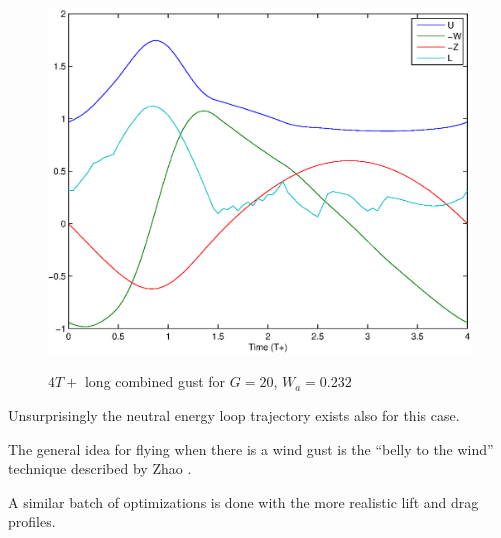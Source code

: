 \begin{figure}[h]
	\begin{center}
		\scalebox{0.8}
		{\includegraphics{./Figures/Windtype=3_Tg=4_Wg=0p232_quad_G=20.eps}}
	\end{center}
	\caption{$4T+$ long combined gust for $G=20$, $W_a=0.232$}
	\label{fig:combined_optimization}
\end{figure}
  
Unsurprisingly the neutral energy loop trajectory exists also for this case.

\par The general idea for flying when there is a wind gust is the ``belly to the wind'' technique described by Zhao \cite{zhao2004optimal}.

\FloatBarrier

\par A similar batch of optimizations is done with the more realistic lift and drag profiles.


